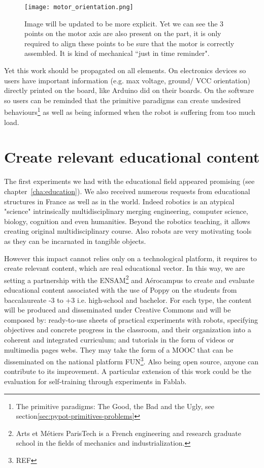 \begin{figure}[tb]
    \centering
        \texttt{[image: motor\_orientation.png]}
    \caption{Image will be updated to be more explicit. Yet we can see the 3 points on the motor axis are also present on the part, it is only required to align these points to be sure that the motor is correctly assembled. It is kind of mechanical “just in time reminder".}
    \label{fig:motor_orientation}
\end{figure}

Yet this work should be propagated on all elements. On electronics devices so users have important information (e.g. max voltage, ground/ VCC orientation) directly printed on the board, like Arduino did on their boards. On the software so users can be reminded that the primitive paradigms can create undesired behaviours\footnote{The primitive paradigms: The Good, the Bad and the Ugly, see section\ref{sec:pypot-primitives-problems}} as well as being informed when the robot is suffering from too much load.

\section{Create relevant educational content} %

The first experiments we had with the educational field appeared promising (see chapter~\ref{cha:education}). We also received numerous requests from educational structures in France as well as in the world. Indeed robotics is an atypical "science" intrinsically multidisciplinary merging engineering, computer science, biology, cognition and even humanities. Beyond the robotics teaching, it allows creating original multidisciplinary course. Also robots are very motivating tools as they can be incarnated in tangible objects.

However this impact cannot relies only on a technological platform, it requires to create relevant content, which are real educational vector.
In this way, we are setting a partnership with the ENSAM\footnote{Arts et Métiers ParisTech is a French engineering and research graduate school in the fields of mechanics and industrialization.} and Aérocampus to create and evaluate educational content associated with the use of Poppy on the students from baccalaureate -3 to +3 i.e. high-school and bachelor. For each type, the content will be produced and disseminated under Creative Commons and will be composed by: ready-to-use sheets of practical experiments with robots, specifying objectives and concrete progress in the classroom, and their organization into a coherent and integrated curriculum; and tutorials in the form of videos or multimedia pages webs.
They may take the form of a MOOC that can be disseminated on the national platform FUN\footnote{REF}. Also being open source, anyone can contribute to its improvement. A particular extension of this work could be the evaluation for self-training through experiments in Fablab.

